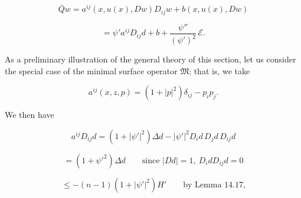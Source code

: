 \begin{equation}
\bar{Q}w=a^{ij}(x,u(x),Dw)D_{ij}w+b(x,u(x),Dw)
\tag{14.40}
\end{equation}

\[
=\psi'a^{ij}D_{ij}d+b+\frac{\psi''}{(\psi')^2}\,\mathcal E.
\]

As a preliminary illustration of the general theory of this section, let us consider the special case of the minimal surface operator $\mathfrak{M}$; that is, we take

\begin{equation}
a^{ij}(x,z,p)=(1+|p|^2)\delta_{ij}-p_ip_j.
\tag{14.41}
\end{equation}

We then have

\begin{equation}
a^{ij}D_{ij}d=(1+|\psi'|^2)\Delta d-|\psi'|^2D_id\,D_jd\,D_{ij}d
\tag{14.42}
\end{equation}

\[
=(1+\psi'^2)\Delta d \qquad \text{since } |Dd|=1,\ D_i d D_{ij}d=0
\]

\[
\le -(n-1)(1+|\psi'|^2)H' \qquad \text{by Lemma 14.17,}
\]



